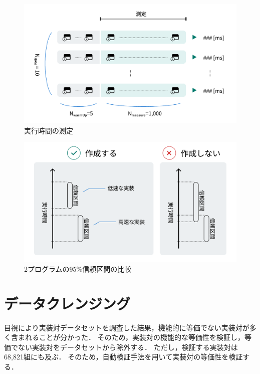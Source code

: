 \documentclass[11pt]{jreport}
\newcommand{\fix}[1]{#1}
\newcommand{\fixtwo}[1]{#1}
\begin{document}
\begin{figure}[t]
\centerline{\includegraphics[width=0.768\linewidth]{Omori_fig/measure.pdf}}
\caption{実行時間の測定}
\label{fig:measure}
\end{figure}

\begin{figure}[t]
\centerline{\includegraphics[width=0.768\linewidth]{Omori_fig/compare.pdf}}
\caption{\fixtwo{2プログラムの95\%信頼区間}の比較}
\label{fig:compare}
\end{figure}


\newpage




\section{データクレンジング}\label{chapter:dataset:clean}


目視により実装対データセットを調査した結果，\fix{機能的に等価}でない実装対が多く含まれることが分かった．
そのため，実装対の機能的な等価性を検証し，\fix{等価}でない実装対をデータセットから除外する．
ただし，検証する実装対は68,821組にも及ぶ．
そのため，自動検証手法を用いて実装対の等価性を検証する．


\end{document}
